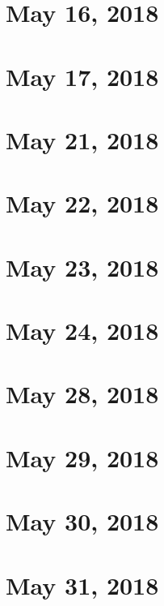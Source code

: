 \documentclass{article}
\begin{document}
\section{May 16, 2018}
\newpage


\section{May 17, 2018}
\newpage


\section{May 21, 2018}
\newpage


\section{May 22, 2018}
\newpage


\section{May 23, 2018}
\newpage


\section{May 24, 2018}
\newpage


\section{May 28, 2018}
\newpage


\section{May 29, 2018}
\newpage


\section{May 30, 2018}
\newpage


\section{May 31, 2018}
\newpage

\end{document}
